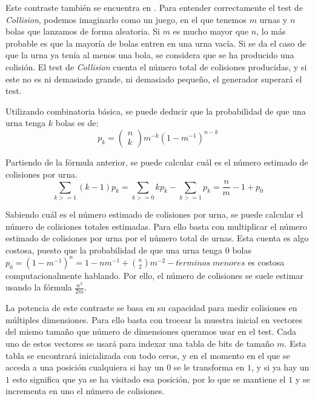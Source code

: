\documentclass{article}
\begin{document}
Este contraste también se encuentra en \citet{knuth2014art}. Para entender correctamente el test de \emph{Collision}, podemos imaginarlo como un juego, en el que tenemos $m$ urnas y $n$ bolas que lanzamos de forma aleatoria. Si $m$ es mucho mayor que $n$, lo más probable es que la mayoría de bolas entren en una urna vacía. Si se da el caso de que la urna ya tenía al menos una bola, se considera que se ha producido una colisión. El test de \emph{Collision} cuenta el número total de colisiones producidas, y si este no es ni demasiado grande, ni demasiado pequeño, el generador superará el test. 

Utilizando combinatoria básica, se puede deducir que la probabilidad de que una urna tenga $k$ bolas es de:
\begin{equation*}
    p_k = 
    \begin{pmatrix}
        n\\
        k
    \end{pmatrix}
    m^{-k}(1-m^{-1})^{n-k}
\end{equation*}

Partiendo de la fórmula anterior, se puede calcular cuál es el número estimado de colisiones por urna.
\begin{equation*}
    \sum_{k>=1}(k-1)p_k = \sum_{k>=0}kp_k-\sum_{k>=1}p_k = \frac{n}{m}-1+p_0 
\end{equation*}

Sabiendo cuál es el número estimado de colisiones por urna, se puede calcular el número de colisiones totales estimadas. Para ello basta con multiplicar el número estimado de colisiones por urna por el número total de urnas. Esta cuenta es algo costosa, puesto que la probabilidad de que una urna tenga $0$ bolas $p_0 = (1-m^{-1})^n = 1-nm^{-1}+\binom{n}{2}m^{-2}-t\acute{e}rminos\;menores$ es costosa computacionalmente hablando. Por ello, el número de colisiones se suele estimar usando la fórmula $\frac{n^2}{2m}$.

La potencia de este contraste se basa en su capacidad para medir colisiones en múltiples dimensiones. Para ello basta con trocear la muestra inicial en vectores del mismo tamaño que número de dimensiones queramos usar en el test. Cada uno de estos vectores se usará para indexar una tabla de bits de  tamaño $m$. Esta tabla se encontrará inicializada con todo ceros, y en el momento en el que se acceda a una posición cualquiera si hay un $0$ se le transforma en $1$, y si ya hay un $1$ esto significa que ya se ha visitado esa posición, por lo que se mantiene el $1$ y se incrementa en uno el número de colisiones.
\end{document}

